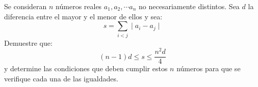 Se consideran $n$ números reales $a_1, a_2, \cdots a_n$ no necesariamente distintos. Sea $d$ la diferencia entre el mayor y el menor de ellos y sea:
\[ s = \sum_{i\lt j} \mid a_i - a_j \mid \]
Demuestre que:
\[ (n-1)d \leq s \leq \frac{n^2 d}{4} \]
y determine las condiciones que deben cumplir estos $n$ números para que se verifique cada una de las igualdades.
